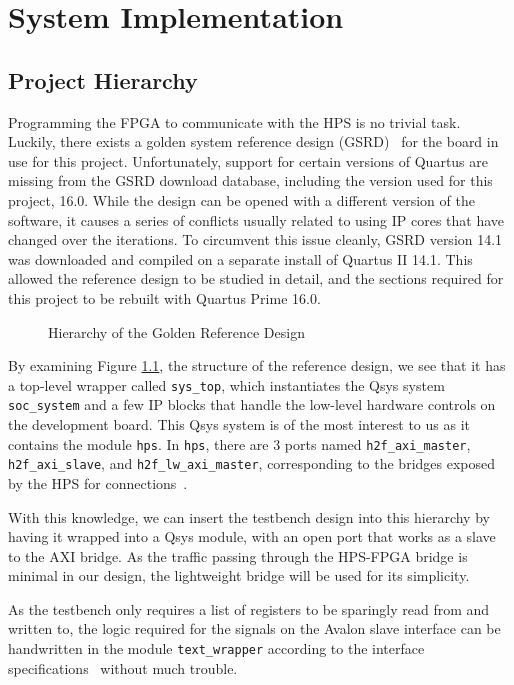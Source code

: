 \chapter{System Implementation}

\section{Project Hierarchy}
Programming the FPGA to communicate with the HPS is no trivial task.
Luckily, there exists a golden system reference design (GSRD)~\cite{Rocket1} for the board in use for this project.
Unfortunately, support for certain versions of Quartus are missing from the GSRD download database, including the version used for this project, 16.0.
While the design can be opened with a different version of the software, it causes a series of conflicts usually related to using IP cores that have changed over the iterations.
To circumvent this issue cleanly, GSRD version 14.1 was downloaded and compiled on a separate install of Quartus II 14.1.
This allowed the reference design to be studied in detail, and the sections required for this project to be rebuilt with Quartus Prime 16.0.

\begin{figure}[H]
  \centering
  
  \caption{Hierarchy of the Golden Reference Design}
  \label{Golden Hierarchy}
\end{figure}

By examining Figure \ref{Golden Hierarchy}, the structure of the reference design, we see that it has a top-level wrapper called \texttt{sys\_top}, which instantiates the Qsys system \texttt{soc\_system} and a few IP blocks that handle the low-level hardware controls on the development board.
This Qsys system is of the most interest to us as it contains the module \texttt{hps}.
In \texttt{hps}, there are 3 ports named \texttt{h2f\_axi\_master}, \texttt{h2f\_axi\_slave}, and \texttt{h2f\_lw\_axi\_master}, corresponding to the bridges exposed by the HPS for connections~\cite{Altera6}.

With this knowledge, we can insert the testbench design into this hierarchy by having it wrapped into a Qsys module, with an open port that works as a slave to the AXI bridge.
As the traffic passing through the HPS-FPGA bridge is minimal in our design, the lightweight bridge will be used for its simplicity.

As the testbench only requires a list of registers to be sparingly read from and written to, the logic required for the signals on the Avalon slave interface can be handwritten in the module \texttt{text\_wrapper} according to the interface specifications~\cite{Intel3} without much trouble.


